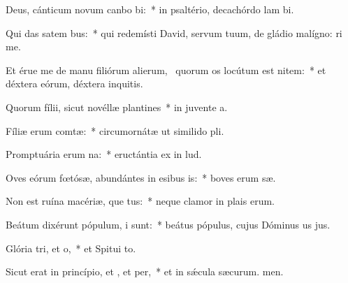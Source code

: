 \item Deus, cánticum novum canbo bi:~* in psaltério, decachórdo lam bi.
\item Qui das satem bus:~* qui redemísti David, servum tuum, de gládio malígno: ri me.
\item Et érue me de manu filiórum alierum,~\pscross{} quorum os locútum est nitem:~* et déxtera eórum, déxtera inquitis.
\item Quorum fílii, sicut novéllæ plantines~* in juvente a.
\item Fíliæ erum comtæ:~* circumornátæ ut similido pli.
\item Promptuária erum na:~* eructántia ex  in lud.
\item Oves eórum fœtósæ, abundántes in esibus is:~* boves erum sæ.
\item Non est ruína macériæ, que tus:~* neque clamor in plais erum.
\item Beátum dixérunt pópulum, i  sunt:~* beátus pópulus, cujus Dóminus us jus.
\item Glória tri, et o,~* et Spitui to.
\item Sicut erat in princípio, et , et per,~* et in sǽcula sæcurum. men.
